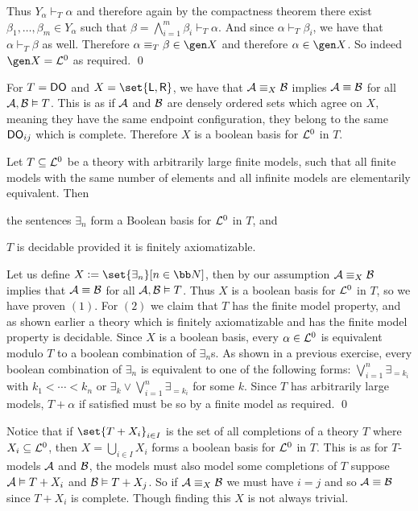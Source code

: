 Thus $Y_\alpha\vdash_T\alpha$ and therefore again by the compactness theorem there exist $\beta_1,\dots,\beta_m\in Y_\alpha$ such that $\beta=\bigwedge_{i=1}^m\beta_i\vdash_T\alpha$.
And since $\alpha\vdash_T\beta_i$, we have that $\alpha\vdash_T\beta$ as well.
Therefore $\alpha\equiv_T\beta\in\gen X$ and therefore $\alpha\in\gen X$.
So indeed $\gen X={\cal L}^0$ as required.
\qed

\bexam

    For $T={\sf DO}$ and $X=\set{{\sf L},{\sf R}}$, we have that ${\cal A}\equiv_X{\cal B}$ implies ${\cal A}\equiv{\cal B}$ for all ${\cal A},{\cal B}\vDash T$.
    This is as if ${\cal A}$ and ${\cal B}$ are densely ordered sets which agree on $X$, meaning they have the same endpoint configuration, they belong to the same ${\sf DO}_{ij}$ which is complete.
    Therefore $X$ is a boolean basis for ${\cal L}^0$ in $T$.

\eexam

\bcoro

    Let $T\subseteq{\cal L}^0$ be a theory with arbitrarily large finite models, such that all finite models with the same number of elements and all infinite models are elementarily equivalent.
    Then
    \benum
        \item the sentences $\exists_n$ form a Boolean basis for ${\cal L}^0$ in $T$, and
        \item $T$ is decidable provided it is finitely axiomatizable.
    \eenum

\ecoro

Let us define $X\coloneqq\set{\exists_n}[n\in{\bb N}]$, then by our assumption ${\cal A}\equiv_X{\cal B}$ implies that ${\cal A}\equiv{\cal B}$ for all ${\cal A},{\cal B}\vDash T$.
Thus $X$ is a boolean basis for ${\cal L}^0$ in $T$, so we have proven $(1)$.
For $(2)$ we claim that $T$ has the finite model property, and as shown earlier a theory which is finitely axiomatizable and has the finite model property is decidable.
Since $X$ is a boolean basis, every $\alpha\in{\cal L}^0$ is equivalent modulo $T$ to a boolean combination of $\exists_n$s.
As shown in a previous exercise, every boolean combination of $\exists_n$ is equivalent to one of the following forms: $\bigvee_{i=1}^n\exists_{=k_i}$ with $k_1<\cdots<k_n$ or
$\exists_k\lor\bigvee_{i=1}^n\exists_{=k_i}$ for some $k$.
Since $T$ has arbitrarily large models, $T+\alpha$ if satisfied must be so by a finite model as required.
\qed

Notice that if $\set{T+X_i}_{i\in I}$ is the set of all completions of a theory $T$ where $X_i\subseteq{\cal L}^0$, then $X=\bigcup_{i\in I}X_i$ forms a boolean basis for ${\cal L}^0$ in $T$.
This is as for $T$-models ${\cal A}$ and ${\cal B}$, the models must also model some completions of $T$ suppose ${\cal A}\vDash T+X_i$ and ${\cal B}\vDash T+X_j$.
So if ${\cal A}\equiv_X{\cal B}$ we must have $i=j$ and so ${\cal A}\equiv{\cal B}$ since $T+X_i$ is complete.
Though finding this $X$ is not always trivial.

